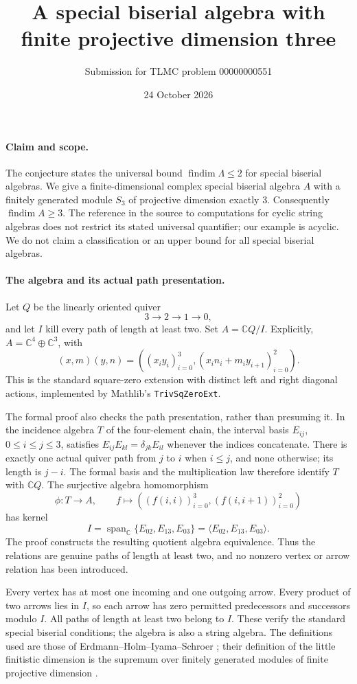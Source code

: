 \documentclass[11pt,a4paper]{article}
\title{A special biserial algebra with finite projective dimension three}
\author{Submission for TLMC problem 00000000551}
\date{24 October 2026}
\newcommand{\C}{\mathbb C}
\newcommand{\findim}{\operatorname{findim}}
\begin{document}
\maketitle

\paragraph{Claim and scope.}
The conjecture states the universal bound $\findim\Lambda\leq2$ for special
biserial algebras. We give a finite-dimensional complex special biserial algebra
$A$ with a finitely generated module $S_3$ of projective dimension exactly $3$.
Consequently $\findim A\geq3$. The reference in the source to computations for
cyclic string algebras does not restrict its stated universal quantifier; our
example is acyclic. We do not claim a classification or an upper bound for all
special biserial algebras.

\paragraph{The algebra and its actual path presentation.}
Let $Q$ be the linearly oriented quiver
\[
3\longrightarrow2\longrightarrow1\longrightarrow0,
\]
and let $I$ kill every path of length at least two. Set $A=\C Q/I$.
Explicitly, $A=\C^4\oplus\C^3$, with
\[
(x,m)(y,n)=\left((x_i y_i)_{i=0}^3,
 (x_i n_i+m_i y_{i+1})_{i=0}^2\right).
\]
This is the standard square-zero extension with distinct left and right
diagonal actions, implemented by Mathlib's \texttt{TrivSqZeroExt}.

The formal proof also checks the path presentation, rather than presuming it.
In the incidence algebra $T$ of the four-element chain, the interval basis
$E_{ij}$, $0\leq i\leq j\leq3$, satisfies
$E_{ij}E_{kl}=\delta_{jk}E_{il}$ whenever the indices concatenate.
There is exactly one actual quiver path from $j$ to $i$ when $i\leq j$, and
none otherwise; its length is $j-i$. The formal basis and the multiplication
law therefore identify $T$ with $\C Q$. The surjective algebra homomorphism
\[
\phi:T\longrightarrow A,\qquad
f\longmapsto ((f(i,i))_{i=0}^3,(f(i,i+1))_{i=0}^2)
\]
has kernel
\[
I=\operatorname{span}_{\C}\{E_{02},E_{13},E_{03}\}
 =\langle E_{02},E_{13},E_{03}\rangle.
\]
The proof constructs the resulting quotient algebra equivalence. Thus the
relations are genuine paths of length at least two, and no nonzero vertex or
arrow relation has been introduced.

Every vertex has at most one incoming and one outgoing arrow. Every product
of two arrows lies in $I$, so each arrow has zero permitted predecessors and
successors modulo $I$. All paths of length at least two belong to $I$.
These verify the standard special biserial conditions; the algebra is also a
string algebra. The definitions used are those of Erdmann--Holm--Iyama--Schroer
\cite[pp.~168--170]{ehis}; their definition of the little finitistic dimension
is the supremum over finitely generated modules of finite projective dimension
\cite[p.~160]{ehis}.
\end{document}
